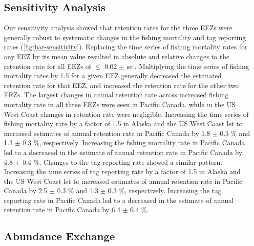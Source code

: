 \documentclass{article}
\newcommand{\lr}[1]{{\color{blue}#1}}
\begin{document}
\subsection{Sensitivity Analysis}

Our sensitivity analysis showed that retention rates for the three EEZs were generally robust to systematic changes in the fishing mortality and tag reporting rates (\autoref{fig:bar-sensitivity}). Replacing the time series of fishing mortality rates for any EEZ by its mean value resulted in absolute and relative changes to the retention rate for all EEZs of $\leq$ \num{0.02} $\pm$ \lr{se} . Multiplying the time series of fishing mortality rates by \num{1.5} for a given EEZ generally decreased the estimated retention rate for that EEZ, and increased the retention rate for the other two EEZs. The largest changes in annual retention rate across increased fishing mortality rate in all three EEZs were seen in Pacific Canada, while in the US West Coast changes in retention rate were negligible. Increasing the time series of fishing mortality rate by a factor of \num{1.5} in Alaska and the US West Coast let to increased estimates of annual retention rate in Pacific Canada by \num{1.8} $\pm$ \num{0.3} \% and \num{1.3} $\pm$ \num{0.3} \%, respectively. Increasing the fishing mortality rate in Pacific Canada led to a decreased in the estimate of annual retention rate in Pacific Canada by \num{4.8} $\pm$ \num{0.4} \%. Changes to the tag reporting rate showed a similar pattern. Increasing the time series of tag reporting rate by a factor of \num{1.5} in Alaska and the US West Coast let to increased estimates of annual retention rate in Pacific Canada by \num{2.5} $\pm$ \num{0.3} \% and \num{1.3} $\pm$ \num{0.3} \%, respectively. Increasing the tag reporting rate in Pacific Canada led to a decreased in the estimate of annual retention rate in Pacific Canada by \num{6.4} $\pm$ \num{0.4} \%.

\subsection{Abundance Exchange}
\end{document}

